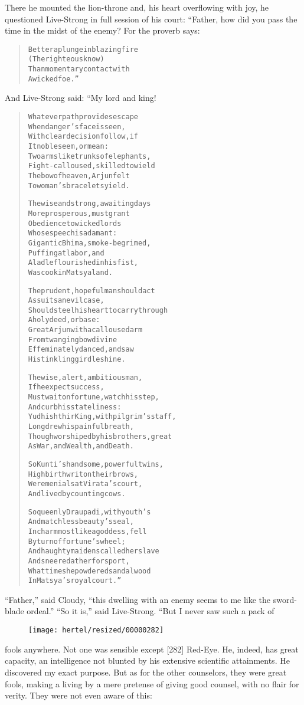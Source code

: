 \documentclass[article, twoside, 10pt]{memoir}
\renewenvironment{verbatim}{%
\begin{quote}%
\vskip -10pt%
\begin{alltt}\normalfont\small}{\end{alltt}%
\end{quote}%
\vskip -10pt
} %
\begin{document}
There he mounted the lion-throne and, his heart overflowing with
joy, he questioned Live-Strong in full session of his court:
“Father, how did you pass the time in the midst of the enemy? For
the proverb says:

\begin{verbatim}
Better a plunge in blazing fire
    (The righteous know)
Than momentary contact with
    A wicked foe.”
\end{verbatim}
And Live-Strong said: “My lord and king!

\begin{verbatim}
Whatever path provides escape
    When danger's face is seen,
With clear decision follow, if
    It noble seem, or mean:
Two arms like trunks of elephants,
    Fight-calloused, skilled to wield
The bow of heaven, Arjun felt
    To woman's bracelets yield.

The wise and strong, awaiting days
    More prosperous, must grant
Obedience to wicked lords
    Whose speech is adamant:
Gigantic Bhima, smoke-begrimed,
    Puffing at labor, and
A ladle flourished in his fist,
    Was cook in Matsya land.

The prudent, hopeful man should act
    As suits an evil case,
Should steel his heart to carry through
    A holy deed, or base:
Great Arjun with a calloused arm
    From twanging bow divine
Effeminately danced, and saw
    His tinkling girdle shine.

The wise, alert, ambitious man,
    If he expect success,
Must wait on fortune, watch his step,
    And curb his stateliness:
Yudhishthir King, with pilgrim's staff,
    Long drew his painful breath,
Though worshiped by his brothers, great
    As War, and Wealth, and Death.

So Kunti's handsome, powerful twins,
    High birth writ on their brows,
Were menials at Virata's court,
    And lived by counting cows.

So queenly Draupadi, with youth's
    And matchless beauty's seal,
In charm most like a goddess, fell
    By turn of fortune's wheel;
And haughty maidens called her slave
    And sneered at her for sport,
What time she powdered sandalwood
    In Matsya's royal court.”
\end{verbatim}
``Father,'' said Cloudy,
``this dwelling with an enemy seems to me like the sword-blade ordeal.''
``So it is,'' said Live-Strong. “But I never saw such a pack of
\begin{figure}[p]\texttt{[image: hertel/resized/00000282]}\end{figure}fools anywhere. Not one was sensible except [282] Red-Eye. He,
indeed, has great capacity, an intelligence not blunted by his
extensive scientific attainments. He discovered my exact purpose.
But as for the other counselors, they were great fools, making a
living by a mere pretense of giving good counsel, with no flair for
verity. They were not even aware of this:
\end{document}
